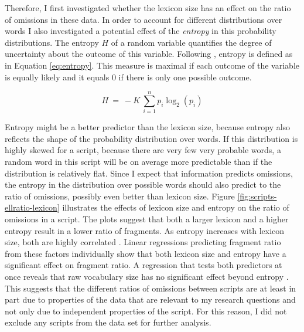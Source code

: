 Therefore, I first investigated whether the lexicon size has an effect on the ratio of omissions in these data. In order to account for different distributions over words I also investigated a potential effect of the \textit{entropy} in this probability distributions. The entropy $H$ of a random variable quantifies the degree of uncertainty about the outcome of this variable. Following \citet[393]{shannon1948}, entropy is defined as in Equation \ref{eq:entropy}. This measure is maximal if each outcome of the variable is equally likely and it equals 0 if there is only one possible outcome.

\begin{equation}
 H\ =\ - K\ \sum_{i=1}^n  p_i \log_2  (p_i) \label{eq:entropy}
\end{equation}

Entropy might be a better predictor than the lexicon size, because entropy also reflects the shape of the probability distribution over words. If this distribution is highly skewed for a script, because there are very few very probable words, a random word in this script will be on average more predictable than if the distribution is relatively flat. Since I expect that information predicts omissions, the entropy in the distribution over possible words should also predict to the ratio of omissions, possibly even better than lexicon size. Figure \ref{fig:scripts-ellratio-lexicon} illustrates the effects of lexicon size and entropy on the ratio of omissions in a script. The plots suggest that both a larger lexicon and a higher entropy result in a lower ratio of fragments. As entropy increases with lexicon size, both are highly correlated . Linear regressions predicting fragment ratio from these factors individually show that both lexicon size  and entropy  have a significant effect on fragment ratio. A regression that tests both predictors at once reveals that raw vocabulary size has no significant effect beyond entropy . This suggests that the different ratios of omissions between scripts are at least in part due to properties of the data that are relevant to my research questions and not only due to independent properties of the script. For this reason, I did not exclude any scripts from the data set for further analysis.

